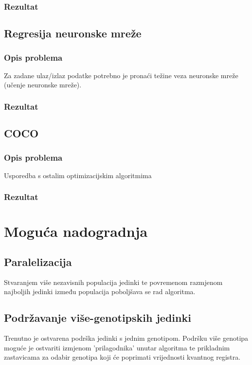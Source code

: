 \documentclass[times, utf8, zavrsni]{fer}
\begin{document}
\subsection{Rezultat}

\section{Regresija neuronske mreže}
\subsection{Opis problema}
Za zadane ulaz/izlaz podatke potrebno je pronaći težine veza neuronske mreže (učenje neuronske mreže).

\subsection{Rezultat}

\section{COCO}
\subsection{Opis problema}
Usporedba s ostalim optimizacijskim algoritmima

\subsection{Rezultat}

\newpage

\chapter{Moguća nadogradnja}
\section{Paralelizacija}
Stvaranjem više nezavisnih populacija jedinki te povremenom razmjenom najboljih jedinki između populacija poboljšava se rad algoritma.

\section{Podržavanje više-genotipskih jedinki}
Trenutno je ostvarena podrška jedinki s jednim genotipom. Podršku više genotipa moguće je ostvariti izmjenom 'prilagodnika' unutar algoritma te prikladnim zastavicama za odabir genotipa koji će poprimati vrijednosti kvantnog registra.
\end{document}
